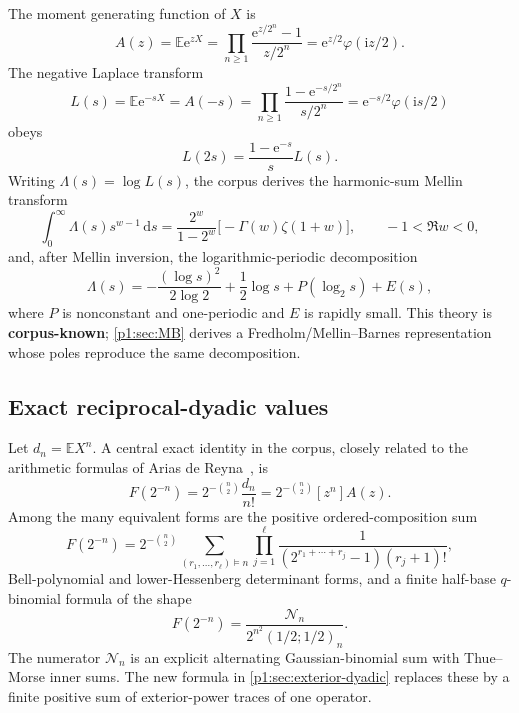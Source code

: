\documentclass[11pt,oneside]{article}
\theoremstyle{definition}
\newcommand{\dd}{\,\mathrm d}
\newcommand{\e}{\mathrm e}
\newcommand{\ii}{\mathrm i}
\newcommand{\E}{\mathbb E}
\newcommand{\phiF}{\varphi}
\newcommand{\CorpusKnown}{\textcolor{linkblue}{\textbf{corpus-known}}}
\begin{document}
The moment generating function of \(X\) is
\begin{equation}
 A(z)=\E\e^{zX}
 =\prod_{n\ge1}\frac{\e^{z/2^n}-1}{z/2^n}
 =\e^{z/2}\phiF(\ii z/2).
 \label{p1:eq:A-product}
\end{equation}
The negative Laplace transform
\begin{equation}
 L(s)=\E\e^{-sX}=A(-s)
 =\prod_{n\ge1}\frac{1-\e^{-s/2^n}}{s/2^n}
 =\e^{-s/2}\phiF(\ii s/2)
 \label{p1:eq:L-product}
\end{equation}
obeys
\begin{equation}
 L(2s)=\frac{1-\e^{-s}}{s}L(s).
 \label{p1:eq:L-scaling}
\end{equation}
Writing \(\Lambda(s)=\log L(s)\), the corpus derives the harmonic-sum Mellin transform
\begin{equation}
 \int_0^\infty \Lambda(s)s^{w-1}\dd s
 =\frac{2^w}{1-2^w}\bigl[-\Gamma(w)\zeta(1+w)\bigr],
 \qquad -1<\Re w<0,
 \label{p1:eq:known-Mellin}
\end{equation}
and, after Mellin inversion, the logarithmic-periodic decomposition
\begin{equation}
 \Lambda(s)=-\frac{(\log s)^2}{2\log2}+\frac12\log s
 +P(\log_2s)+E(s),
 \label{p1:eq:endpoint-periodic}
\end{equation}
where \(P\) is nonconstant and one-periodic and \(E\) is rapidly small.  This theory is
\CorpusKnown{}; \cref{p1:sec:MB} derives a Fredholm/Mellin--Barnes representation whose
poles reproduce the same decomposition.

\subsection{Exact reciprocal-dyadic values}

Let \(d_n=\E X^n\).  A central exact identity in the corpus, closely related to the arithmetic formulas of
Arias de Reyna~\cite{p1:Arias2018}, is
\begin{equation}
 \boxed{\quad
 F(2^{-n})=2^{-\binom n2}\frac{d_n}{n!}
 =2^{-\binom n2}[z^n]A(z).
 \quad}
 \label{p1:eq:dyadic-moment}
\end{equation}
Among the many equivalent forms are the positive ordered-composition sum
\begin{equation}
 F(2^{-n})=2^{-\binom n2}
 \sum_{(r_1,\ldots,r_\ell)\vDash n}
 \prod_{j=1}^{\ell}
 \frac1{(2^{r_1+\cdots+r_j}-1)(r_j+1)!},
 \label{p1:eq:ordered-composition}
\end{equation}
Bell-polynomial and lower-Hessenberg determinant forms, and a finite half-base
\(q\)-binomial formula of the shape
\begin{equation}
 F(2^{-n})=\frac{\mathcal N_n}{2^{n^2}(1/2;1/2)_n}.
 \label{p1:eq:q-shape}
\end{equation}
The numerator \(\mathcal N_n\) is an explicit alternating Gaussian-binomial sum with
Thue--Morse inner sums.  The new formula in \cref{p1:sec:exterior-dyadic} replaces these
by a finite positive sum of exterior-power traces of one operator.
\end{document}
